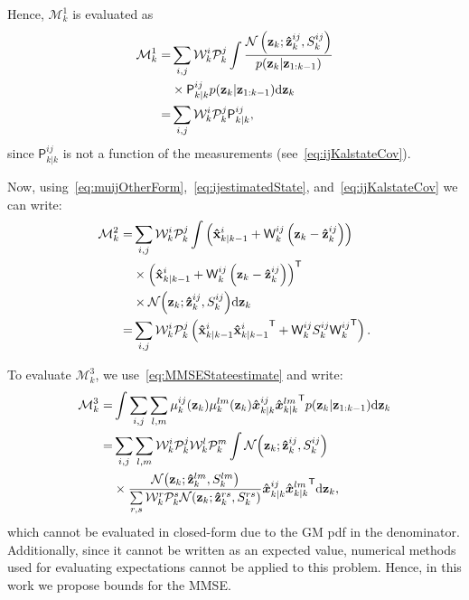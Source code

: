 \documentclass[10pt,twocolumn,twoside]{IEEEtran}
\newcommand{\tran}{^{\mathsf{T}}}
\newcommand{\corcol}[1]{\textcolor{CorCol}{#1}}
\begin{document}
Hence, \(\mathcal{M}_k^1\) is evaluated as
\begin{align}
\nonumber
\mathcal{M}_k^1 = & \sum \limits _{i,j} \corcol{\mathcal{W}^i_k\mathcal{P}^j_k} \int \frac{\mathcal{N}\left(\mathbf{z}_k; \mathbf{\hat{z}}_{k}^{ij}, S_k^{ij}\right)}{p{\left(\mathbf{{z}}_{k}|\mathbf{{z}}_{1:k-1}\right)}}\\
& \times \mathsf{P}_{k|k}^{ij}p{\left(\mathbf{{z}}_{k}|\mathbf{{z}}_{1:k-1}\right)}\mathrm{d}\mathbf{{z}}_{k} 
\\ \label{eq:M1} = &
 \sum \limits _{i,j} \corcol{\mathcal{W}^i_k\mathcal{P}^j_k} \mathsf{P}_{k|k}^{ij},
\end{align}
since \(\mathsf{P}_{k|k}^{ij}\) is not a function of the measurements (see~\eqref{eq:ijKalstateCov}). 

Now, using~\eqref{eq:muijOtherForm},~\eqref{eq:ijestimatedState}, and~\eqref{eq:ijKalstateCov} we can write:
\begin{align}
\nonumber
\mathcal{M}_k^2 = & \sum \limits _{i,j} \corcol{\mathcal{W}^i_k\mathcal{P}^j_k} \int \left(\mathbf{\hat{{x}}}_{k|k-1}^{i} +\mathsf{W}_k^{ij} \left( \mathbf{z}_{k} - \mathbf{\hat{z}}_{k}^{ij} \right)\right)\\
\nonumber
& \times \left(\mathbf{\hat{{x}}}_{k|k-1}^{i} 
 +\mathsf{W}_k^{ij} \left( \mathbf{z}_{k} - \mathbf{\hat{z}}_{k}^{ij} \right)\right)\tran \\ 
& \times {\mathcal{N}{\left(\mathbf{z}_k; \mathbf{\hat{z}}_{k}^{ij}, S_k^{ij}\right)}}\mathrm{d}\mathbf{{z}}_{k}
\\ \label{eq:M2} = & \sum \limits _{i,j} \corcol{\mathcal{W}^i_k\mathcal{P}^j_k} \left(\mathbf{\hat{{x}}}_{k|k-1}^{i}\mathbf{\hat{{x}}}{_{k|k-1}^{i}}\tran + \mathsf{W}_k^{ij}S_k^{ij} \mathsf{W}{_k^{ij}}\tran \right).
\end{align}

To evaluate \(\mathcal{M}_k^3\), we use~\eqref{eq:MMSEStateestimate} and write:
\begin{align}
\nonumber
\mathcal{M}_k^3 = & \int \sum \limits _{i,j} \sum \limits _{l,m} \mu_{k}^{ij}{\left(\mathbf{z}_{k}\right)} \mu_{k}^{lm}{\left(\mathbf{z}_{k}\right)}\mathsf{\hat{\boldsymbol{x}}}_{k|k}^{ij} \mathsf{\hat{\boldsymbol{x}}}{_{k|k}^{lm}}\tran p{\left(\mathbf{{z}}_{k}|\mathbf{{z}}_{1:k-1}\right)} \mathrm{d}\mathbf{{z}}_{k}
\\ 
\nonumber
= & \sum \limits _{i,j} \sum \limits _{l,m}\corcol{\mathcal{W}^i_k\mathcal{P}^j_k}\corcol{\mathcal{W}^l_k\mathcal{P}^m_k} \int \mathcal{N}{\left(\mathbf{z}_k; \mathbf{\hat{z}}_{k}^{ij}, S_k^{ij}\right)}\\
& \times \frac{ \mathcal{N}{\left(\mathbf{z}_k; \mathbf{\hat{z}}_{k}^{lm}, S_k^{lm}\right)}}{\sum \limits _{r,s} \corcol{\mathcal{W}^r_k\mathcal{P}^s_k}\mathcal{N}{\left(\mathbf{z}_k; \mathbf{\hat{z}}_{k}^{rs}, S_k^{rs}\right)}}  \mathsf{\hat{\boldsymbol{x}}}_{k|k}^{ij} \mathsf{\hat{\boldsymbol{x}}}{_{k|k}^{lm}}\tran \mathrm{d}\mathbf{{z}}_{k},
\end{align}
which cannot be evaluated in closed-form due to the GM pdf in the denominator. Additionally, since it cannot be written as an expected value, numerical methods used for evaluating expectations cannot be applied to this problem. Hence, in this work we propose bounds for the MMSE. 
%
 
\end{document}
